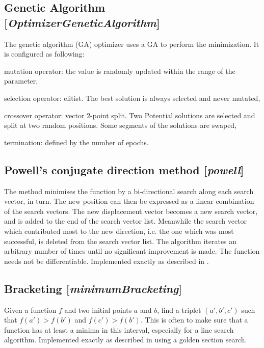 \documentclass[11pt]{article}
\newcommand{\nllref}[1]{[\small{\textit{#1}}]}
\begin{document}
\FloatBarrier

\subsection{Genetic Algorithm \nllref{OptimizerGeneticAlgorithm}}
The genetic algorithm (GA) optimizer uses a GA to perform the minimization. It is configured as following:
\begin{compactitem}
\item mutation operator: the value is randomly updated within the range of the parameter,
\item selection operator: elitist. The best solution is always selected and never mutated,
\item crossover operator: vector 2-point split. Two Potential solutions are selected and split at two random positions. Some segments of the solutions are swaped,
\item termination: defined by the number of epochs.
\end{compactitem}

\subsection{Powell's conjugate direction method \nllref{powell}}
The method minimises the function by a bi-directional search along each search vector, in turn. The new position can then be expressed as a linear combination of the search vectors. The new displacement vector becomes a new search vector, and is added to the end of the search vector list. Meanwhile the search vector which contributed most to the new direction, i.e. the one which was most successful, is deleted from the search vector list. The algorithm iterates an arbitrary number of times until no significant improvement is made. The function needs not be differentiable. Implemented exactly as described in \cite{NumericalRecipes}.


\subsection{Bracketing \nllref{minimumBracketing}}
Given a function $f$ and two initial points $a$ and $b$, find a triplet $(a', b', c')$ such that $f(a')>f(b')$ and  $f(c')>f(b')$. This is often to make sure that a function has at least a minima in this interval, especially for a line search algorithm. Implemented exactly as described in \cite{NumericalRecipes} using a golden section search.
\end{document}
